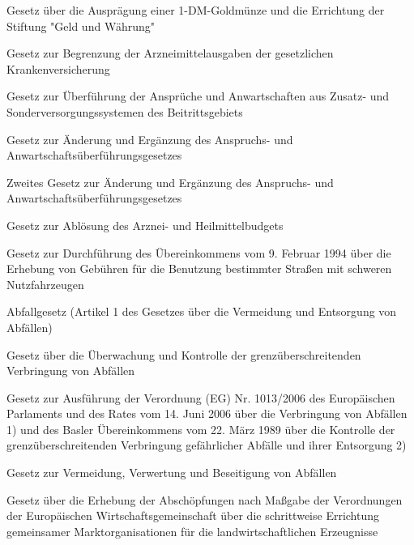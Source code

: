 \item[{1-DM-GoldmünzG}] Gesetz über die Ausprägung einer 1-DM-Goldmünze und die Errichtung der Stiftung "Geld und Währung"

\item[{AABG}] Gesetz zur Begrenzung der Arzneimittelausgaben der gesetzlichen Krankenversicherung

\item[{AAÜG}] Gesetz zur Überführung der Ansprüche und Anwartschaften aus Zusatz- und Sonderversorgungssystemen des Beitrittsgebiets

\item[{AAÜGÄndG}] Gesetz zur Änderung und Ergänzung des Anspruchs- und Anwartschaftsüberführungsgesetzes

\item[{AAÜGÄndG-2}] Zweites Gesetz zur Änderung und Ergänzung des Anspruchs- und Anwartschaftsüberführungsgesetzes

\item[{ABAG}] Gesetz zur Ablösung des Arznei- und Heilmittelbudgets

\item[{ABBG}] Gesetz zur Durchführung des Übereinkommens vom 9. Februar 1994 über die Erhebung von Gebühren für die Benutzung bestimmter Straßen mit schweren Nutzfahrzeugen

\item[{AbfallG}] Abfallgesetz (Artikel 1 des Gesetzes über die Vermeidung und Entsorgung von Abfällen)

\item[{AbfVerbrG}] Gesetz über die Überwachung und Kontrolle der grenzüberschreitenden Verbringung von Abfällen

\item[{AbfVerbrG-2007}] Gesetz zur Ausführung der Verordnung (EG) Nr. 1013/2006 des Europäischen Parlaments und des Rates vom 14. Juni 2006 über die Verbringung von Abfällen 1) und des Basler Übereinkommens vom 22. März 1989 über die Kontrolle der grenzüberschreitenden Verbringung gefährlicher Abfälle und ihrer Entsorgung 2)

\item[{AbfVVBG}] Gesetz zur Vermeidung, Verwertung und Beseitigung von Abfällen

\item[{AbG}] Gesetz über die Erhebung der Abschöpfungen nach Maßgabe der Verordnungen der Europäischen Wirtschaftsgemeinschaft über die schrittweise Errichtung gemeinsamer Marktorganisationen für die landwirtschaftlichen Erzeugnisse

